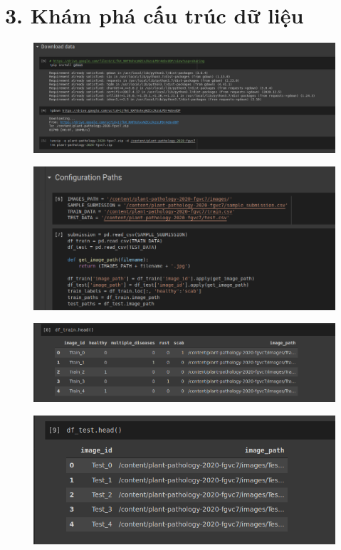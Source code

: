 \documentclass{article}
\begin{document}
	\section{3. Khám phá cấu trúc dữ liệu}
	\begin{figure}[H]
		\centering
		\includegraphics[width=0.75\linewidth]{images/download_plant_pathology_dataset.png}
		\label{fig:writing-thesis}
	\end{figure}
	\begin{figure}[H]
		\centering
		\includegraphics[width=0.75\linewidth]{images/configuration_paths.png}
		\label{fig:writing-thesis}
	\end{figure}
	\begin{figure}[H]
		\centering
		\includegraphics[width=0.75\linewidth]{images/head_df_train.png}
		\label{fig:writing-thesis}
	\end{figure}
	\begin{figure}[H]
		\centering
		\includegraphics[width=0.75\linewidth]{images/head_df_test.png}
		\label{fig:writing-thesis}
	\end{figure}
	
\end{document}
